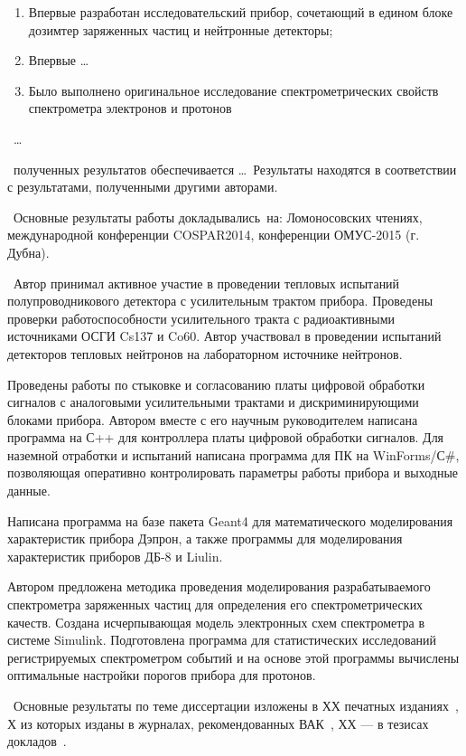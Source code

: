 \novelty
\begin{enumerate}
  \item Впервые разработан исследовательский прибор, сочетающий в едином блоке дозимтер заряженных частиц и нейтронные детекторы;
  \item Впервые \ldots
  \item Было выполнено оригинальное исследование спектрометрических свойств спектрометра электронов и протонов
\end{enumerate}

\influence\ \ldots

\reliability\ полученных результатов обеспечивается \ldots \ Результаты находятся в соответствии с результатами, полученными другими авторами.

\probation\
Основные результаты работы докладывались~на:
Ломоносовских чтениях, международной конференции COSPAR2014, конференции ОМУС-2015 (г. Дубна).

\contribution\ Автор принимал активное участие в проведении тепловых испытаний полупроводникового детектора с усилительным трактом прибора. Проведены проверки работоспособности усилительного тракта с радиоактивными источниками ОСГИ Cs137 и Co60. Автор участвовал в проведении испытаний детекторов тепловых нейтронов на лабораторном источнике нейтронов. 

Проведены работы по стыковке и согласованию платы цифровой обработки сигналов с аналоговыми усилительными трактами и дискриминирующими блоками прибора. Автором вместе с его научным руководителем написана программа на С++ для контроллера платы цифровой обработки сигналов. Для наземной отработки и испытаний написана программа для ПК на WinForms/С\#, позволяющая оперативно контролировать параметры работы прибора и выходные данные. 

Написана программа на базе пакета Geant4 для математического моделирования характеристик прибора Дэпрон, а также программы для моделирования характеристик приборов ДБ-8 и Liulin. 

Автором предложена методика проведения моделирования разрабатываемого спектрометра заряженных частиц для определения его спектрометрических качеств. Создана исчерпывающая модель электронных схем спектрометра в системе Simulink. Подготовлена программа для статистических исследований регистрируемых спектрометром событий и на основе этой программы вычислены оптимальные настройки порогов прибора для протонов. 

\publications\ Основные результаты по теме диссертации изложены в ХХ печатных изданиях~\cite{Sokolov,Gaidaenko,Lermontov,Management},
Х из которых изданы в журналах, рекомендованных ВАК~\cite{Sokolov,Gaidaenko}, 
ХХ --- в тезисах докладов~\cite{Lermontov,Management}.
